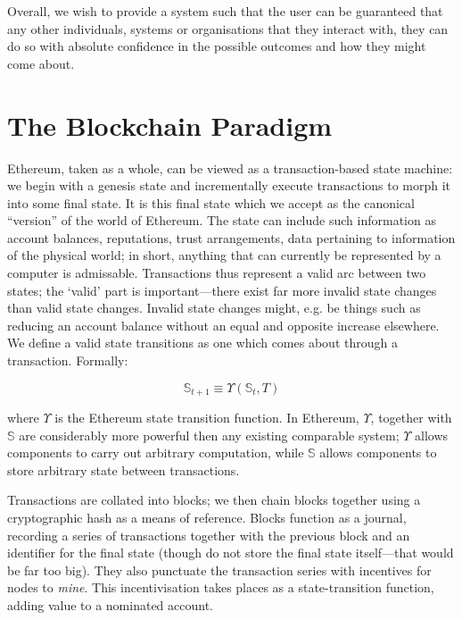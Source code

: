 \documentclass[9pt,oneside]{amsart}
\makeatletter
\newcommand*\eg{e.g.\@\xspace}
\makeatother
\begin{document}
\begin{multicols}{2}
Overall, we wish to provide a system such that the user can be guaranteed that any other individuals, systems or organisations that they interact with, they can do so with absolute confidence in the possible outcomes and how they might come about.


\section{The Blockchain Paradigm} \label{ch:overview}

Ethereum, taken as a whole, can be viewed as a transaction-based state machine: we begin with a genesis state and incrementally execute transactions to morph it into some final state. It is this final state which we accept as the canonical ``version'' of the world of Ethereum. The state can include such information as account balances, reputations, trust arrangements, data pertaining to information of the physical world; in short, anything that can currently be represented by a computer is admissable. Transactions thus represent a valid arc between two states; the `valid' part is important---there exist far more invalid state changes than valid state changes. Invalid state changes might, \eg be things such as reducing an account balance without an equal and opposite increase elsewhere. We define a valid state transitions as one which comes about through a transaction. Formally:

\begin{equation}
\mathbb{S}_{t+1} \equiv \Upsilon(\mathbb{S}_t, T)
\end{equation}

where $\Upsilon$ is the Ethereum state transition function. In Ethereum, $\Upsilon$, together with $\mathbb{S}$ are considerably more powerful then any existing comparable system; $\Upsilon$ allows components to carry out arbitrary computation, while $\mathbb{S}$ allows components to store arbitrary state between transactions.

Transactions are collated into blocks; we then chain blocks together using a cryptographic hash as a means of reference. Blocks function as a journal, recording a series of transactions together with the previous block and an identifier for the final state (though do not store the final state itself---that would be far too big). They also punctuate the transaction series with incentives for nodes to \textit{mine}. This incentivisation takes places as a state-transition function, adding value to a nominated account.


\end{multicols}
\end{document}
